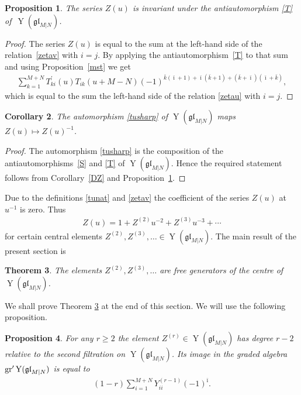 \documentclass[pdftex]{sigma}
\numberwithin{equation}{section}
\newtheorem{Theorem}{Theorem}[section]
\newtheorem{Corollary}[Theorem]{Corollary}
\newtheorem{Proposition}[Theorem]{Proposition}
\def\bi{{\bar\imath }}
\def\bk{{\bar k }}
\def\glMN{\mathfrak{gl}_{M|N}}
\def\grpr{{\rm gr}^{\prime} }
\def\TP{T^{\prime}}
\def\YMN{\operatorname{Y}(\glMN)}
\begin{document}
\begin{Proposition}\label{TZ}The series $Z(u)$ is invariant under the antiautomorphism \eqref{T}
of~$\YMN $.
\end{Proposition}

\begin{proof}
The series $Z(u)$ is equal to the sum at the left-hand side of
the relation~\eqref{zetav} with $i=j $. By applying
the antiautomorphism~\eqref{T} to that sum and using Proposition~\ref{mst}
we get
\begin{gather*}
\sum_{k=1}^{M+N}
\TP_{ki}(u) T_{ik}(u+M-N)
{(-1)}^{\bk( \bi + 1) + \bi ( \bk + 1) +
( \bk + \bi )( \bi + \bk )},
\end{gather*}
which is equal
to the sum the left-hand side of the relation \eqref{zetau} with $i=j $.
\end{proof}

\begin{Corollary}\label{STZ}The automorphism \eqref{tusharp} of $\YMN$ maps $Z(u)\mapsto Z(u)^{-1} $.
\end{Corollary}

\begin{proof}The automorphism \eqref{tusharp} is the composition of the antiautomorphisms~\eqref{S} and \eqref{T} of $\YMN $. Hence the required statement follows from Corollary~\ref{DZ} and Proposition~\ref{TZ}.
\end{proof}

Due to the definitions \eqref{tunat} and \eqref{zetav}
the coefficient of the series $Z(u)$ at $u^{-1}$ is zero. Thus
\begin{gather}\label{zud}
Z(u)=1+Z^{(2)} u^{-2}+Z^{(3)} u^{-3}+\cdots
\end{gather}
for certain central elements $Z^{(2)},Z^{(3)},\ldots\in\YMN $.
The main result of the present section is

\begin{Theorem}
\label{Z}
The elements $Z^{(2)},Z^{(3)},\dots$ are free generators
of the centre of $\YMN $.
\end{Theorem}

We shall prove Theorem \ref{Z} at the end of this section.
We will use the following proposition.

\begin{Proposition}
\label{P28}
For any $r\geqslant2$ the element
$Z^{(r)}\in\YMN$ has degree $r-2$
relative to the second filtration on $\YMN $. Its image
in the graded algebra $\grpr\YMN$ is equal to
\begin{gather}
\label{zim}
( 1-r ) \sum_{i=1}^{M+N} Y^{(r-1)}_{ii} (-1)^{\bi} .
\end{gather}
\end{Proposition}
\end{document}
